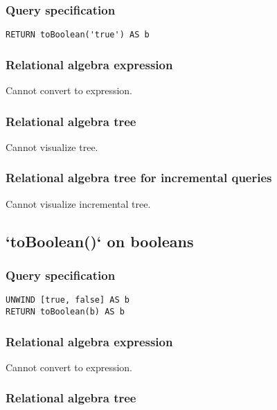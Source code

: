 \subsubsection*{Query specification}

\begin{lstlisting}
RETURN toBoolean('true') AS b
\end{lstlisting}

\subsubsection*{Relational algebra expression}

Cannot convert to expression.

\subsubsection*{Relational algebra tree}

Cannot visualize tree.

\subsubsection*{Relational algebra tree for incremental queries}

Cannot visualize incremental tree.

\subsection{`toBoolean()` on booleans}

\subsubsection*{Query specification}

\begin{lstlisting}
UNWIND [true, false] AS b
RETURN toBoolean(b) AS b
\end{lstlisting}

\subsubsection*{Relational algebra expression}

Cannot convert to expression.

\subsubsection*{Relational algebra tree}

